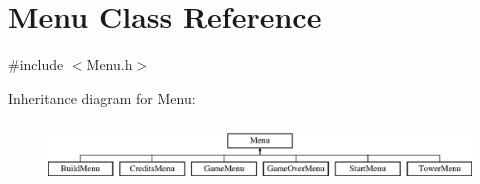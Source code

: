 \hypertarget{class_menu}{\section{Menu Class Reference}
\label{class_menu}
}


{\ttfamily \#include $<$Menu.\+h$>$}

Inheritance diagram for Menu\+:\begin{figure}[H]
\begin{center}
\leavevmode
\includegraphics[height=1.651917cm]{class_menu}
\end{center}
\end{figure}

